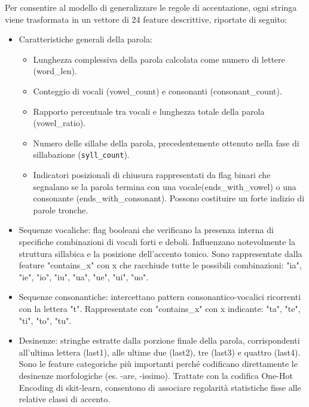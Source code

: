 Per consentire al modello di generalizzare le regole di accentazione, ogni stringa viene trasformata in un vettore di 24 feature descrittive, 
riportate di seguito:
\begin{itemize}
      \item Caratteristiche generali della parola:
            \begin{itemize}
                  \item Lunghezza complessiva della parola calcolata come numero di lettere (word\_len). 
                  \item Conteggio di vocali (vowel\_count) e consonanti (consonant\_count). 
                  \item Rapporto percentuale tra vocali e lunghezza totale della parola (vowel\_ratio). 
                  \item Numero delle sillabe della parola, precedentemente ottenuto nella fase di sillabazione (\texttt{syll\_count}).
                  \item Indicatori posizionali di chiusura rappresentati da flag binari che segnalano se la parola termina con una 
                  vocale(ends\_with\_vowel) o una consonante (ends\_with\_consonant). Possono costituire un forte indizio di parole tronche.
            \end{itemize}
      \item Sequenze vocaliche: flag booleani che verificano la presenza interna di specifiche combinazioni di vocali forti e deboli. Influenzano 
      notevolmente la struttura sillabica e la posizione dell'accento tonico. Sono rappresentate dalla feature "contains\_x" con x che racchiude tutte 
      le possibili combinazioni: "ia", "ie", "io", "iu", "ua", "ue", "ui", "uo".
      \item Sequenze consonantiche: intercettano pattern consonantico-vocalici ricorrenti con la lettera "t". Rappresentate con "contains\_x" con x indicante: 
      "ta", "te", "ti", "to", "tu".
      \item Desinenze: stringhe estratte dalla porzione finale della parola, corrispondenti all'ultima lettera (last1), alle ultime due (last2), tre (last3) 
      e quattro (last4). Sono le feature categoriche più importanti perché codificano direttamente le desinenze morfologiche (es. -are, -issimo). 
      Trattate con la codifica One-Hot Encoding di skit-learn, consentono di associare regolarità statistiche fisse alle relative classi di accento.
\end{itemize}


